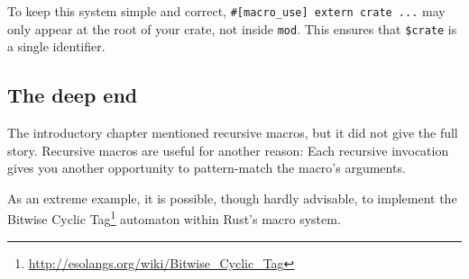 \documentclass[a4paper,]{book}
\newenvironment{Shaded}{\begin{snugshade}}{\end{snugshade}}
\newcommand{\DecValTok}[1]{\textcolor[rgb]{0.00,0.00,0.81}{{#1}}}
\newcommand{\CommentTok}[1]{\textcolor[rgb]{0.56,0.35,0.01}{\textit{{#1}}}}
\newcommand{\OtherTok}[1]{\textcolor[rgb]{0.56,0.35,0.01}{{#1}}}
\newcommand{\NormalTok}[1]{{#1}}
\renewcommand{\href}[2]{#2\footnote{\url{#1}}}
\begin{document}
To keep this system simple and correct,
\texttt{\#{[}macro\_use{]}\ extern\ crate\ ...} may only appear at the
root of your crate, not inside \texttt{mod}. This ensures that
\texttt{\$crate} is a single identifier.

\subsection{The deep end}\label{the-deep-end}

The introductory chapter mentioned recursive macros, but it did not give
the full story. Recursive macros are useful for another reason: Each
recursive invocation gives you another opportunity to pattern-match the
macro's arguments.

As an extreme example, it is possible, though hardly advisable, to
implement the \href{http://esolangs.org/wiki/Bitwise_Cyclic_Tag}{Bitwise
Cyclic Tag} automaton within Rust's macro system.

\begin{Shaded}
\end{Shaded}
\end{document}
